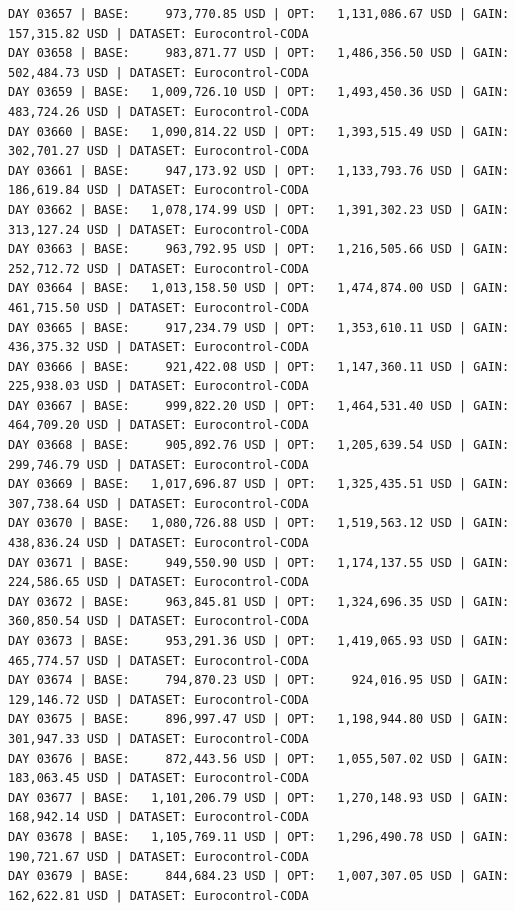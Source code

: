 \documentclass[11pt,a4paper]{article}
\begin{document}
\begin{verbatim}
DAY 03657 | BASE:     973,770.85 USD | OPT:   1,131,086.67 USD | GAIN: 157,315.82 USD | DATASET: Eurocontrol-CODA
DAY 03658 | BASE:     983,871.77 USD | OPT:   1,486,356.50 USD | GAIN: 502,484.73 USD | DATASET: Eurocontrol-CODA
DAY 03659 | BASE:   1,009,726.10 USD | OPT:   1,493,450.36 USD | GAIN: 483,724.26 USD | DATASET: Eurocontrol-CODA
DAY 03660 | BASE:   1,090,814.22 USD | OPT:   1,393,515.49 USD | GAIN: 302,701.27 USD | DATASET: Eurocontrol-CODA
DAY 03661 | BASE:     947,173.92 USD | OPT:   1,133,793.76 USD | GAIN: 186,619.84 USD | DATASET: Eurocontrol-CODA
DAY 03662 | BASE:   1,078,174.99 USD | OPT:   1,391,302.23 USD | GAIN: 313,127.24 USD | DATASET: Eurocontrol-CODA
DAY 03663 | BASE:     963,792.95 USD | OPT:   1,216,505.66 USD | GAIN: 252,712.72 USD | DATASET: Eurocontrol-CODA
DAY 03664 | BASE:   1,013,158.50 USD | OPT:   1,474,874.00 USD | GAIN: 461,715.50 USD | DATASET: Eurocontrol-CODA
DAY 03665 | BASE:     917,234.79 USD | OPT:   1,353,610.11 USD | GAIN: 436,375.32 USD | DATASET: Eurocontrol-CODA
DAY 03666 | BASE:     921,422.08 USD | OPT:   1,147,360.11 USD | GAIN: 225,938.03 USD | DATASET: Eurocontrol-CODA
DAY 03667 | BASE:     999,822.20 USD | OPT:   1,464,531.40 USD | GAIN: 464,709.20 USD | DATASET: Eurocontrol-CODA
DAY 03668 | BASE:     905,892.76 USD | OPT:   1,205,639.54 USD | GAIN: 299,746.79 USD | DATASET: Eurocontrol-CODA
DAY 03669 | BASE:   1,017,696.87 USD | OPT:   1,325,435.51 USD | GAIN: 307,738.64 USD | DATASET: Eurocontrol-CODA
DAY 03670 | BASE:   1,080,726.88 USD | OPT:   1,519,563.12 USD | GAIN: 438,836.24 USD | DATASET: Eurocontrol-CODA
DAY 03671 | BASE:     949,550.90 USD | OPT:   1,174,137.55 USD | GAIN: 224,586.65 USD | DATASET: Eurocontrol-CODA
DAY 03672 | BASE:     963,845.81 USD | OPT:   1,324,696.35 USD | GAIN: 360,850.54 USD | DATASET: Eurocontrol-CODA
DAY 03673 | BASE:     953,291.36 USD | OPT:   1,419,065.93 USD | GAIN: 465,774.57 USD | DATASET: Eurocontrol-CODA
DAY 03674 | BASE:     794,870.23 USD | OPT:     924,016.95 USD | GAIN: 129,146.72 USD | DATASET: Eurocontrol-CODA
DAY 03675 | BASE:     896,997.47 USD | OPT:   1,198,944.80 USD | GAIN: 301,947.33 USD | DATASET: Eurocontrol-CODA
DAY 03676 | BASE:     872,443.56 USD | OPT:   1,055,507.02 USD | GAIN: 183,063.45 USD | DATASET: Eurocontrol-CODA
DAY 03677 | BASE:   1,101,206.79 USD | OPT:   1,270,148.93 USD | GAIN: 168,942.14 USD | DATASET: Eurocontrol-CODA
DAY 03678 | BASE:   1,105,769.11 USD | OPT:   1,296,490.78 USD | GAIN: 190,721.67 USD | DATASET: Eurocontrol-CODA
DAY 03679 | BASE:     844,684.23 USD | OPT:   1,007,307.05 USD | GAIN: 162,622.81 USD | DATASET: Eurocontrol-CODA

\end{verbatim}
\end{document}
